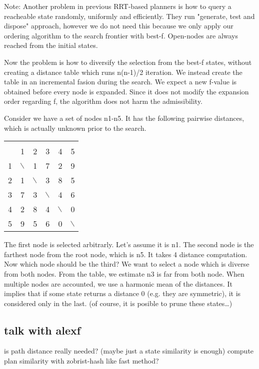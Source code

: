 Note: Another problem in previous RRT-based planners is how to query a reacheable
state randomly, uniformly and efficiently. They run "generate, test and
dispose" approach, however we do not need this because we only apply our
ordering algorithm to the search frontier with best-f. Open-nodes are
always reached from the initial states.

Now the problem is how to diversify the selection from the best-f states,
without creating a distance table which runs n(n-1)/2 iteration.
We instead create the table in an incremental fasion during the search.
We expect a new f-value is obtained before every node is expanded.
Since it does not modify the expansion order regarding f, the algorithm
does not harm the admissibility.

Consider we have a set of nodes n1-n5. It has the following
pairwise distances, which is actually unknown prior to the search.

\begin{center}
\begin{tabular}{r|rrrrr|}
 &  &  &  &  & \\
 & 1 & 2 & 3 & 4 & 5\\
\hline
1 & $\backslash$ & 1 & 7 & 2 & 9\\
2 & 1 & $\backslash$ & 3 & 8 & 5\\
3 & 7 & 3 & $\backslash$ & 4 & 6\\
4 & 2 & 8 & 4 & $\backslash$ & 0\\
5 & 9 & 5 & 6 & 0 & $\backslash$\\
\hline
\end{tabular}
\end{center}

The first node is selected arbitrarly. Let's assume it is n1.
The second node is the farthest node from the root node, which is n5. It
takes 4 distance computation.
Now which node should be the third?
We want to select a node which is diverse from both nodes.
From the table, we estimate n3 is far from both node.
When multiple nodes are accounted, we use a harmonic mean of the distances.
It implies that if some state returns a distance 0 (e.g. they are
symmetric), it is considered only in the last. (of course, it is posible to
prune these states\ldots{})
\subsection{talk with alexf}
\label{sec-2-2}

is path distance really needed? (maybe just a state similarity is enough)
compute plan similarity with zobrist-hash like fast method?

